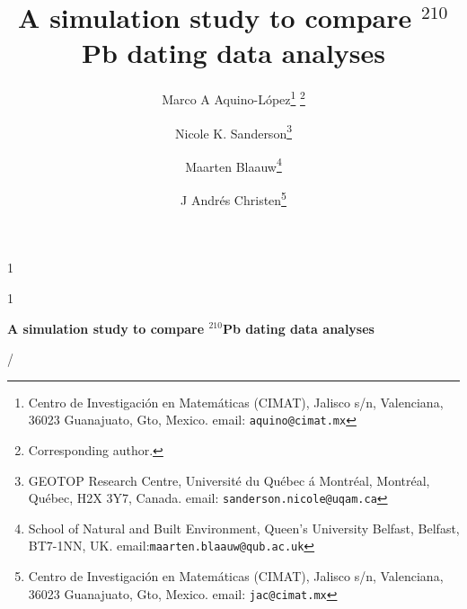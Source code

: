 \documentclass [10pt] {article}
\date{ }
\newcommand{\ac}{\color{red} }  %
\newcommand{\ca}{\color{black}} %
\newcommand{\blind}{1}
\newcommand{\papertitle}{
\ac A simulation study to compare $^{210}$Pb dating data analyses \ca}
\begin{document}
	\def\spacingset#1{\renewcommand{\baselinestretch}%
		{#1}\small\normalsize} \spacingset{1}
	\blind
	{
		\title{\textbf{\papertitle}}

		\author{Marco A Aquino-L\'opez\thanks{
				Centro de Investigaci\'on en Matem\'aticas (CIMAT),
				Jalisco s/n, Valenciana, 36023 Guanajuato, Gto, Mexico.
				email: \texttt{aquino@cimat.mx} } \thanks{Corresponding author.}
					\and
			Nicole K. Sanderson\thanks{
				GEOTOP Research Centre, Universit\'e du Qu\'ebec \'a Montr\'eal, 
				Montr\'eal, Qu\'ebec, H2X 3Y7, Canada. 
				email: \texttt{sanderson.nicole@uqam.ca}}
					\and
			Maarten Blaauw\thanks{School of Natural and Built Environment,
				Queen's University Belfast,
				Belfast, BT7-1NN, UK.
				email:\texttt{maarten.blaauw@qub.ac.uk}  }
					\and
			J Andr\'es Christen\thanks{
				Centro de Investigaci\'on en Matem\'aticas (CIMAT),
				Jalisco s/n, Valenciana, 36023 Guanajuato, Gto, Mexico.
				email: \texttt{jac@cimat.mx}  }
			}
		\maketitle
	} \fi

	\blind
	{
		\bigskip
		\bigskip
		\bigskip
		\begin{center}
			{\LARGE\bf \papertitle}
		\end{center}
		\medskip/
	} \fi
\end{document}
